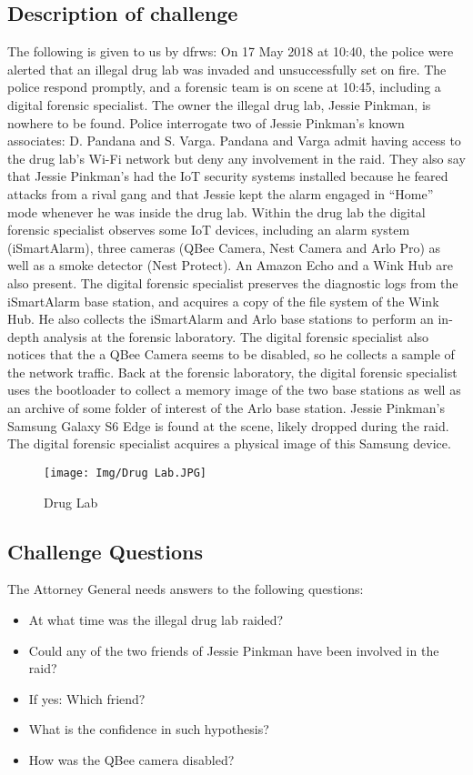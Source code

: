 \documentclass{easychair}
\begin{document}
\subsection{Description of challenge}
\label{callengescenario} The following is given to us by dfrws:
On 17 May 2018 at 10:40, the police were alerted that an illegal drug lab was invaded and
unsuccessfully set on fire. The police respond promptly, and a forensic team is on scene at 10:45,
including a digital forensic specialist.
The owner the illegal drug lab, Jessie Pinkman, is nowhere to be found. Police interrogate two of
Jessie Pinkman’s known associates: D. Pandana and S. Varga. Pandana and Varga admit having
access to the drug lab’s Wi-Fi network but deny any involvement in the raid. They also say that Jessie
Pinkman’s had the IoT security systems installed because he feared attacks from a rival gang and
that Jessie kept the alarm engaged in “Home” mode whenever he was inside the drug lab.
Within the drug lab the digital forensic specialist observes some IoT devices, including an alarm
system (iSmartAlarm), three cameras (QBee Camera, Nest Camera and Arlo Pro) as well as a smoke
detector (Nest Protect). An Amazon Echo and a Wink Hub are also present.
The digital forensic specialist preserves the diagnostic logs from the iSmartAlarm base station, and
acquires a copy of the file system of the Wink Hub. He also collects the iSmartAlarm and Arlo base
stations to perform an in-depth analysis at the forensic laboratory.
The digital forensic specialist also notices that the a QBee Camera seems to be disabled, so he
collects a sample of the network traffic.
Back at the forensic laboratory, the digital forensic specialist uses the bootloader to collect a memory
image of the two base stations as well as an archive of some folder of interest of the Arlo base station.
Jessie Pinkman's Samsung Galaxy S6 Edge is found at the scene, likely dropped during the raid.
The digital forensic specialist acquires a physical image of this Samsung device.


\begin{figure}[h]
    \centering
    \texttt{[image: Img/Drug Lab.JPG]}
    \caption{Drug Lab}
    \label{fig:Drug Lab}
\end{figure}

\subsection{Challenge Questions}
The Attorney General needs answers to the following questions:
\begin{itemize}
    \item At what time was the illegal drug lab raided?
\item Could any of the two friends of Jessie Pinkman have been involved in the raid?
\item If yes: Which friend?
\item What is the confidence in such hypothesis?
\item How was the QBee camera disabled?
\end{itemize}
\end{document}
